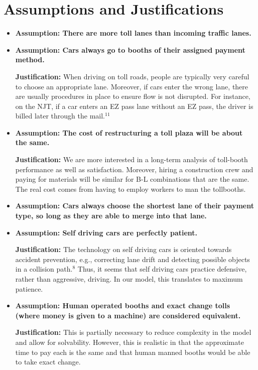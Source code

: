 \documentclass{article}
\begin{document}
\section{Assumptions and Justifications}
\begin{itemize}

\item \textbf{Assumption: There are more toll lanes than incoming traffic lanes.}

\item \textbf{Assumption: Cars always go to booths of their assigned payment method.} 

\noindent \textbf{Justification: } When driving on toll roads, people are typically very careful to choose an appropriate lane. Moreover, if cars enter the wrong lane, there are usually procedures in place to ensure flow is not disrupted. For instance, on the NJT, if a car enters an EZ pass lane without an EZ pass, the driver is billed later through the mail.$^{\text{11}}$

\item \textbf{Assumption: The cost of restructuring a toll plaza will be about the same.} 

\noindent \textbf{Justification: } We are more interested in a long-term analysis of toll-booth performance as well as satisfaction. Moreover, hiring a construction crew and paying for materials will be similar for B-L combinations that are the same. The real cost comes from having to employ workers to man the tollbooths.

\item \textbf{Assumption: Cars always choose the shortest lane of their payment type, so long as they are able to merge into that lane.}

\item \textbf{Assumption: Self driving cars are perfectly patient.}

\noindent \textbf{Justification: } The technology on self driving cars is oriented towards accident prevention, e.g., correcting lane drift and detecting possible objects in a collision path.$^{\text{8}}$ Thus, it seems that self driving cars practice defensive, rather than aggressive, driving. In our model, this translates to maximum patience.

\item \textbf{Assumption: Human operated booths and exact change tolls (where money is given to a machine) are considered equivalent.} 

\noindent \textbf{Justification: } This is partially necessary to reduce complexity in the model and allow for solvability. However, this is realistic in that the approximate time to pay each is the same and that human manned booths would be able to take exact change.


\end{itemize}
\end{document}
